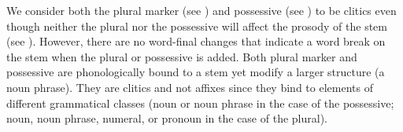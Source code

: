 We consider both the plural marker (see ) and possessive (see ) to be clitics even though neither the plural nor the possessive will affect the prosody of the stem (see ). However, there are no word-final changes that indicate a word break on the stem when the plural or possessive is added. Both plural marker and possessive are phonologically bound to a stem yet modify a larger structure (a noun phrase). They are clitics and not affixes since they bind to elements of different grammatical classes (noun or noun phrase in the case of the possessive; noun, noun phrase, numeral, or pronoun in the case of the plural). 